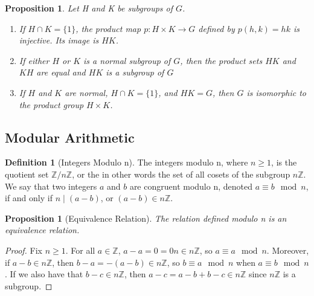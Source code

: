 \documentclass[12pt]{article}
\newtheorem{prop}[thm]{Proposition}
\theoremstyle{definition}
\newtheorem{defn}[thm]{Definition}
\theoremstyle{remark}
\numberwithin{equation}{section}
\newcommand\Z{\mathbb Z}    %
\begin{document}
\vspace{15pt}

\begin{prop}
        Let H and K be subgroups of $G$. \begin{enumerate}
                \item If $H\cap K = \{1\}$, the product map $p:H\times K \rightarrow G$ defined by $p(h,k) = hk$ is injective. Its image is $HK$.
                \item If either $H$ or $K$ is a normal subgroup of $G$, then the product sets $HK$ and $KH$ are equal and $HK$ is a subgroup of $G$
                \item If $H$ and $K$ are normal, $H\cap K = \{1\}$, and $HK = G$, then $G$ is isomorphic to the product group $H\times K$.
        \end{enumerate}
\end{prop}

\vspace{15pt}







\subsection{Modular Arithmetic}

\begin{defn}[Integers Modulo n]
        The integers modulo n, where $n \geq 1$, is the quotient set $\Z/n\Z$, or the in other words the set of all cosets of the subgroup $n\Z$. We say that two integers $a$ and $b$ are congruent modulo n, denoted $a \equiv b \mod n$, if and only if $n\;\vert\;(a-b)$, or $(a-b) \in n\Z$.
\end{defn}


\vspace{15pt}

\begin{prop}[Equivalence Relation]
        The relation defined modulo n is an equivalence relation.
\end{prop}
\begin{proof}
        Fix $n \geq 1$. For all $a \in \Z$, $a-a = 0 = 0n \in n\Z$, so $a \equiv a \mod n$. Moreover, if $a-b \in n\Z$, then $b-a = -(a-b) \in n\Z$, so $b \equiv a \mod n$ when $a \equiv b \mod n$. If we also have that $b - c \in n\Z$, then $a - c = a-b +b-c \in n\Z$ since $n\Z$ is a subgroup.
\end{proof}

\vspace{15pt}
\end{document}
